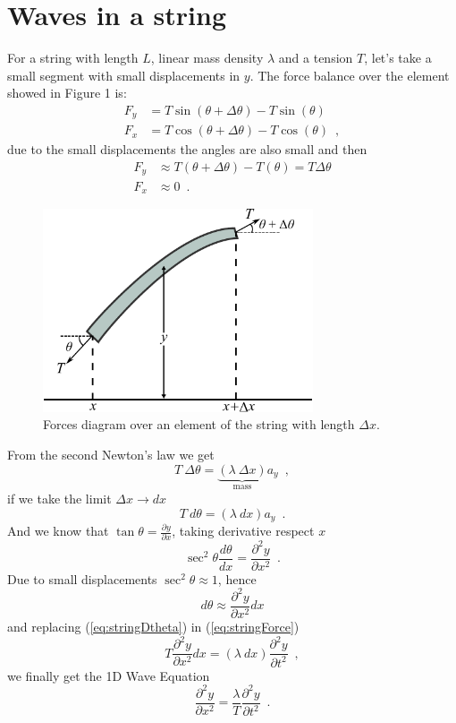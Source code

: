 \documentclass[12pt,letterpaper]{article}
\begin{document}
\section{Waves in a string}
For a string with length $L$, linear mass density $\lambda$ and a tension $T$, let's take a small segment with small displacements in $y$. The force balance over the element showed in Figure 1 is:
\begin{align*}
F_y &= T \sin(\theta + \Delta \theta) - T \sin(\theta)\\
F_x &= T \cos(\theta + \Delta \theta) - T \cos(\theta) \enspace ,
\end{align*}
due to the small displacements the angles are also small and then
\begin{align*}
F_y &\approx T (\theta + \Delta \theta) - T (\theta) = T \Delta \theta\\
F_x &\approx 0 \enspace .
\end{align*}

\begin{figure}[h]
\centering
\includegraphics[height=6cm]{img/string.pdf}
\caption{Forces diagram over an element of the string with length $\Delta x$. }
\end{figure}

From the second Newton's law we get
\[T\ \Delta \theta = \underbrace{(\lambda\ \Delta x)}_\text{mass} a_y \enspace ,\]
if we take the limit $\Delta x \rightarrow dx$
\begin{equation}
T\ d\theta = (\lambda\ dx) a_y \enspace .
\label{eq:stringForce}
\end{equation}
And we know that $\tan \theta = \frac{\partial y}{\partial x}$, taking derivative respect $x$
\[\sec^2 \theta \frac{d\theta}{dx} = \frac{\partial^2 y}{\partial x^2} \enspace .\]
Due to small displacements $\sec^2 \theta \approx 1$, hence
\begin{equation}
d\theta \approx \frac{\partial^2 y}{\partial x^2} dx
\label{eq:stringDtheta}
\end{equation}
and replacing (\ref{eq:stringDtheta}) in  (\ref{eq:stringForce})
\[T \frac{\partial^2 y}{\partial x^2} dx = (\lambda\ dx) \frac{\partial^2 y}{\partial t^2} \enspace ,\]
we finally get the 1D Wave Equation
\[\frac{\partial^2 y}{\partial x^2} = \frac{\lambda}{T} \frac{\partial^2 y}{\partial t^2} \enspace .\]
\end{document}
